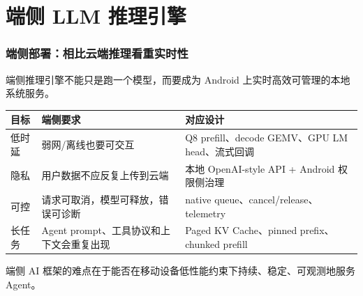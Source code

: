 \section{端侧 LLM 推理引擎}

\begin{frame}
  \frametitle{端侧部署：相比云端推理看重实时性}
  \small
  端侧推理引擎不能只是跑一个模型，而要成为 Android 上实时高效可管理的本地系统服务。

  \vspace{0.45em}
  \scriptsize
  \begin{tabularx}{\textwidth}{p{}Y Y}
    \toprule
    目标 & 端侧要求 & 对应设计 \\
    \midrule
    低时延 & 弱网/离线也要可交互 & Q8 prefill、decode GEMV、GPU LM head、流式回调 \\
    隐私 & 用户数据不应反复上传到云端 & 本地 OpenAI-style API + Android 权限侧治理 \\
    可控 & 请求可取消，模型可释放，错误可诊断 & native queue、cancel/release、 telemetry \\
    长任务 & Agent prompt、工具协议和上下文会重复出现 & Paged KV Cache、pinned prefix、chunked prefill \\
    \bottomrule
  \end{tabularx}

  \vspace{0.45em}
  \normalsize
  端侧 AI 框架的难点在于能否在移动设备低性能约束下持续、稳定、可观测地服务 Agent。
\end{frame}

